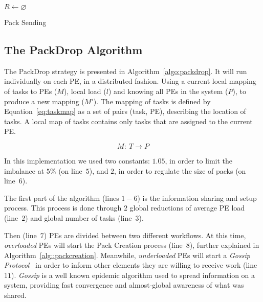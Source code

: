 \begin{algorithm}[!ht]
    \DontPrintSemicolon
    $R \gets \varnothing$ \\
    \caption{Pack Sending}  
    \label{alg::packsend}
\end{algorithm}

\subsection{The PackDrop Algorithm}

The PackDrop strategy is presented in Algorithm~\ref{algo:packdrop}. %
It will run individually on each PE, in a distributed fashion. 
Using a current local mapping of tasks to PEs ($  M$), local load ($l$) and knowing all PEs in the system ($  P$), to produce a new mapping ($  M'$).
The mapping of tasks is defined by Equation~\ref{eq:taskmap} as a set of pairs (task, PE), describing the location of tasks.
A local map of tasks contains only tasks that are assigned to the current PE.

\begin{equation}
	M:\ T \rightarrow P
	\label{eq:taskmap}
\end{equation}

In this implementation we used two constants: $1.05$, in order to limit the imbalance at $5\%$ (on line~$5$), and $2$, in order to regulate the size of packs (on line~$6$).

The first part of the algorithm (lines $1-6$) is the information sharing and setup process. 
This process is done through $2$ global reductions of average PE load (line~$2$) and global number of tasks (line~$3$).

Then (line~$7$) PEs are divided between two different workflows.
At this time, \textit{overloaded} PEs will start the Pack Creation process (line~$8$), further explained in Algorithm~\ref{alg::packcreation}.
Meanwhile, \textit{underloaded} PEs will start a \textit{Gossip Protocol}~\cite{gossip} in order to inform other elements they are willing to receive work (line~$11$).
\textit{Gossip} is a well known epidemic algorithm used to spread information on a system, providing fast convergence and almost-global awareness of what was shared.

